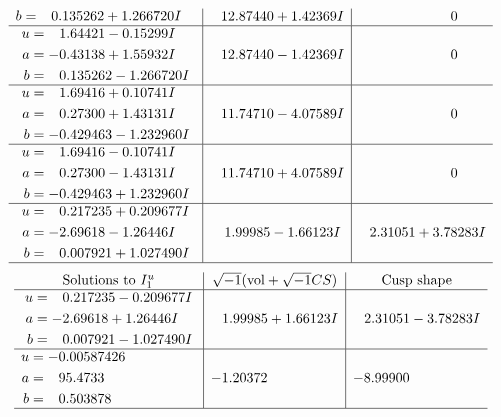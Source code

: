 \documentclass[1p]{elsarticle_modified}
\theoremstyle{definition}
\newcommand{\I}{\sqrt{-1}}
\begin{document}
$$\begin{array}{c|c|c}
\begin{aligned}
b &= \phantom{-}0.135262 + 1.266720 I\end{aligned}
 & \phantom{-}12.87440 + 1.42369 I & \phantom{-0.000000 } 0 \\ \hline\begin{aligned}
u &= \phantom{-}1.64421 - 0.15299 I \\
a &= -0.43138 + 1.55932 I \\
b &= \phantom{-}0.135262 - 1.266720 I\end{aligned}
 & \phantom{-}12.87440 - 1.42369 I & \phantom{-0.000000 } 0 \\ \hline\begin{aligned}
u &= \phantom{-}1.69416 + 0.10741 I \\
a &= \phantom{-}0.27300 + 1.43131 I \\
b &= -0.429463 - 1.232960 I\end{aligned}
 & \phantom{-}11.74710 - 4.07589 I & \phantom{-0.000000 } 0 \\ \hline\begin{aligned}
u &= \phantom{-}1.69416 - 0.10741 I \\
a &= \phantom{-}0.27300 - 1.43131 I \\
b &= -0.429463 + 1.232960 I\end{aligned}
 & \phantom{-}11.74710 + 4.07589 I & \phantom{-0.000000 } 0 \\ \hline\begin{aligned}
u &= \phantom{-}0.217235 + 0.209677 I \\
a &= -2.69618 - 1.26446 I \\
b &= \phantom{-}0.007921 + 1.027490 I\end{aligned}
 & \phantom{-}1.99985 - 1.66123 I & \phantom{-}2.31051 + 3.78283 I\\
 \hline 
 \end{array}$$\newpage$$\begin{array}{c|c|c}  
\text{Solutions to }I^u_{1}& \I (\text{vol} + \sqrt{-1}CS) & \text{Cusp shape}\\
 \hline 
\begin{aligned}
u &= \phantom{-}0.217235 - 0.209677 I \\
a &= -2.69618 + 1.26446 I \\
b &= \phantom{-}0.007921 - 1.027490 I\end{aligned}
 & \phantom{-}1.99985 + 1.66123 I & \phantom{-}2.31051 - 3.78283 I \\ \hline\begin{aligned}
u &= -0.00587426\phantom{ +0.000000I} \\
a &= \phantom{-}95.4733\phantom{ +0.000000I} \\
b &= \phantom{-}0.503878\phantom{ +0.000000I}\end{aligned}
 & -1.20372\phantom{ +0.000000I} & -8.99900\phantom{ +0.000000I}\\
 \hline 
 \end{array}$$\newpage\newpage\renewcommand{\arraystretch}{1}
\end{document}
